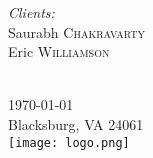 \begin{titlepage}
\begin{minipage}{0.4\textwidth}
\begin{flushright}
\emph{Clients:} \\
Saurabh \textsc{Chakravarty} \\
Eric \textsc{Williamson}
\end{flushright}
\end{minipage}\\[1.5cm]


{\large \today} \\ %
{\small Blacksburg, VA 24061} \\[0.5cm]


\texttt{[image: logo.png]}\\[1cm]
 

\vfill %

\end{titlepage}

